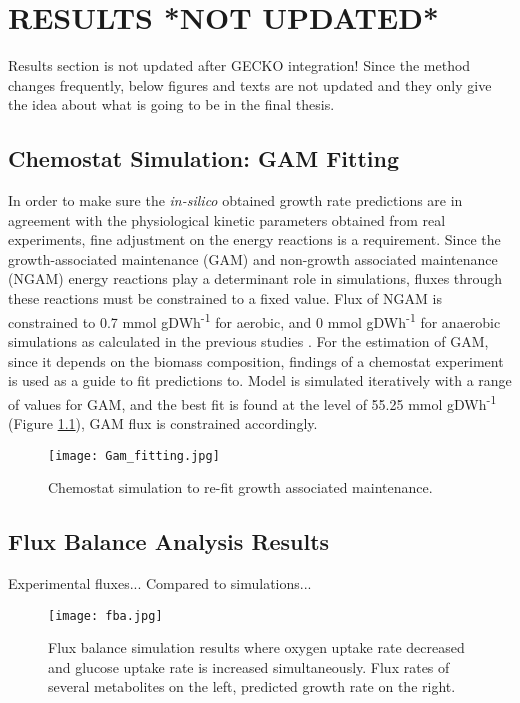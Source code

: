 \chapter{RESULTS *NOT UPDATED*}
Results section is not updated after GECKO integration! Since the method changes frequently, below figures and texts are not updated and they only give the idea about what is going to be in the final thesis.

\section{Chemostat Simulation: GAM Fitting}
In order to make sure the \emph{in-silico} obtained growth rate predictions are in agreement with the physiological kinetic parameters obtained from real experiments, fine adjustment on the energy reactions is a requirement. Since the growth-associated maintenance (GAM) and non-growth associated maintenance (NGAM) energy reactions play a determinant role in simulations, fluxes through these reactions must be constrained to a fixed value. Flux of NGAM is constrained to 0.7 mmol gDWh\textsuperscript{-1} for aerobic, and 0 mmol gDWh\textsuperscript{-1} for anaerobic simulations as calculated in the previous studies \cite{nilsson2016metabolic}. For the estimation of GAM, since it depends on the biomass composition, findings of a chemostat experiment  \cite{van1998effect} is used as a guide to fit predictions to. Model is simulated iteratively with a range of values for GAM, and the best fit is found at the level of 55.25 mmol gDWh\textsuperscript{-1} (Figure \ref{fig:Gam_fitting}), GAM flux is constrained accordingly.

\begin{figure}[H]
\begin{center}
\texttt{[image: Gam\_fitting.jpg]}
\end{center}
\caption[Chemostat simulation to re-fit growth associated maintenance]{Chemostat simulation to re-fit growth associated maintenance.}
\label{fig:Gam_fitting}
\end{figure}


\section{Flux Balance Analysis Results}
Experimental fluxes... Compared to simulations...


\begin{figure}[H]
\begin{center}
\texttt{[image: fba.jpg]}
\end{center}
\caption[Flux balance simulation results]{Flux balance simulation results where oxygen uptake rate decreased and glucose uptake rate is increased simultaneously. Flux rates of several metabolites on the left, predicted growth rate on the right.}
\label{fig:fba}
\end{figure}

